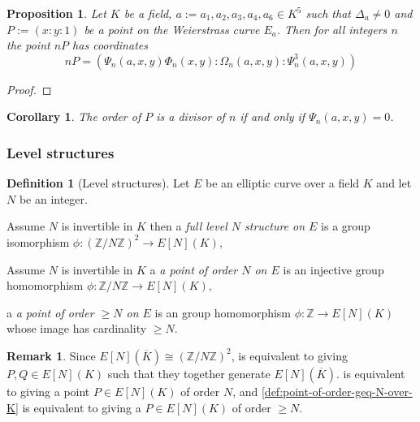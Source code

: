 \documentclass[a4paper,12pt,reqno]{amsart}
\newcommand{\field}[1]{\mathbb{#1}}  %
\newcommand{\Z}{\field{Z}} %
\newtheorem{proposition}[lemma]{Proposition}
\newtheorem{corollary}[lemma]{Corollary}
\theoremstyle{definition}
\newtheorem{definition}[lemma]{Definition}
\newtheorem{remark}[lemma]{Remark}
\numberwithin{lemma}{section}
\numberwithin{equation}{section}
\numberwithin{figure}{section}
\begin{document}
\begin{proposition}\label{stmt:ec-over-k-multiplication-using-division-polynomials}
Let $K$ be a field, $a := a_1,a_2,a_3,a_4,a_6 \in K^5$ such that $\Delta_a \neq 0$ and $P := (x:y:1)$ be a point on the Weierstrass curve $E_a$. Then for all integers $n$ the point $nP$ has coordinates 
$$nP = (\Psi_n(a,x,y)\Phi_n(x,y):\Omega_n(a,x,y): \Psi_n^3(a,x,y))$$
\end{proposition}
\begin{proof}
\end{proof}

\begin{corollary}
The order of $P$ is a divisor of $n$ if and only if $\Psi_n(a,x,y)=0$.
\end{corollary}


\subsubsection{Level structures}

\begin{definition}[Level structures]
	Let $E$ be an elliptic curve over a field $K$ and let $N$ be an integer. 
	\begin{defenum}
		\item Assume $N$ is invertible in $K$ then a \textit{full level $N$ structure on $E$} is a group isomorphism $\phi: (\Z/N\Z)^2 \to  E[N](K),$ \label{def:full-level-structure-over-K}
		\item Assume $N$ is invertible in $K$  a \textit{a point of order $N$ on $E$} is an injective group homomorphism $\phi: \Z/N\Z \to  E[N](K),$ \label{def:point-of-order-N-over-K}
		\item  a \textit{a point of order $\geq N$ on $E$} is an group homomorphism $\phi: \Z \to  E[N](K)$ whose image has cardinality $\geq N$. \label{def:point-of-order-geq-N-over-K}
	\end{defenum}
\end{definition}
\begin{remark}\label{rem:alternative-def-level-structure}
Since $E[N](\overline K) \cong  (\Z/N\Z)^2$,  is equivalent to giving $P,Q \in E[N](K)$ such that they together generate $E[N](\overline K)$.  is equivalent to giving a point $P \in E[N](K)$ of order $N$, and \cref{def:point-of-order-geq-N-over-K} is equivalent to giving a $P \in E[N](K)$ of order $\geq N$.
\end{remark}
\end{document}
